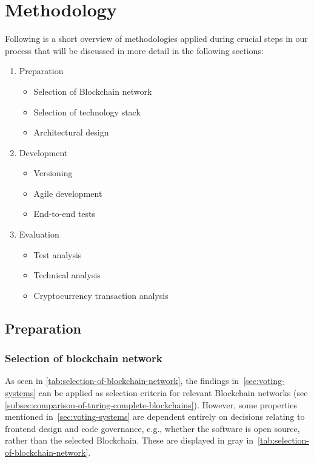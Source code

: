 \chapter{Methodology}\label{ch:methodology}

Following is a short overview of methodologies applied during crucial steps in our process that will be discussed in more detail in the following sections:

\begin{enumerate}
    \item Preparation
    \begin{itemize}
        \item Selection of \gls{Blockchain} network
        \item Selection of technology stack
        \item Architectural design
    \end{itemize}
    \item Development
    \begin{itemize}
        \item Versioning
        \item Agile development
        \item End-to-end tests
    \end{itemize}
    \item Evaluation
    \begin{itemize}
        \item Test analysis
        \item Technical analysis
        \item Cryptocurrency transaction analysis
    \end{itemize}
\end{enumerate}

\section{Preparation}\label{sec:preparation}

\subsection{Selection of blockchain network}\label{subsec:selection-of-blockchain-network}

As seen in \cref{tab:selection-of-blockchain-network}, the findings in~\cref{sec:voting-systems} can be applied as selection criteria for relevant \gls{Blockchain} networks (see \cref{subsec:comparison-of-turing-complete-blockchains}).
However, some properties mentioned in~\cref{sec:voting-systems} are dependent entirely on decisions relating to frontend design and code governance, e.g., whether the software is open source, rather than the selected \gls{Blockchain}.
These are displayed in gray in~\cref{tab:selection-of-blockchain-network}.

